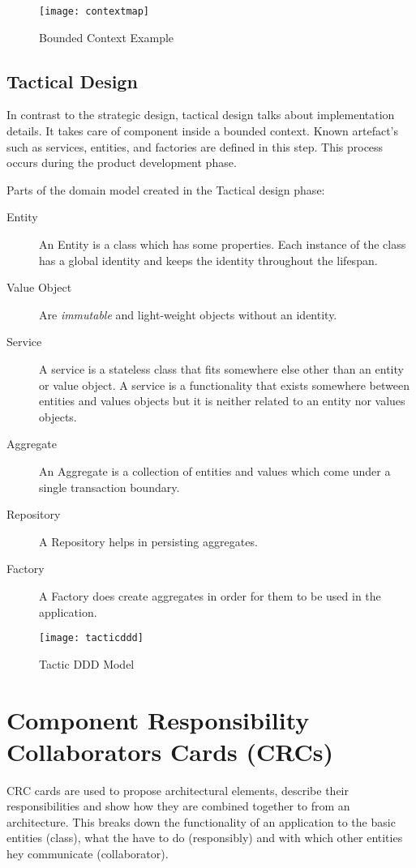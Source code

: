 \begin{figure}[H]
  \center
  \texttt{[image: contextmap]}
  \caption{Bounded Context Example}
  \label{fig:contextmap}
\end{figure}

\pagebreak

\subsection{Tactical Design}
In contrast to the strategic design, tactical design talks about implementation details. It takes care of component inside a bounded context. Known artefact's such as services, entities, and factories are defined in this step. This process occurs during the product development phase.

Parts of the domain model created in the Tactical design phase:
\begin{description}
	\item [Entity] An Entity is a class which has some properties. Each instance of the class has a global identity and keeps the identity throughout the lifespan.
	\item [Value Object] Are \textit{immutable} and light-weight objects without an identity. 
	\item [Service] A service is a stateless class that fits somewhere else other than an entity or value object. A service is a functionality that exists somewhere between entities and values objects but it is neither related to an entity nor values objects.
	\item [Aggregate] An Aggregate is a collection of entities and values which come under a single transaction boundary.
	\item [Repository] A Repository helps in persisting aggregates.
	\item [Factory] A Factory does create aggregates in order for them to be used in the application.
\end{description}

\begin{figure}[H]
  \center
  \texttt{[image: tacticddd]}
  \caption{Tactic DDD Model}
\end{figure}

\section{Component Responsibility Collaborators Cards (CRCs)}
CRC cards are used to propose architectural elements, describe their responsibilities and show how they are combined together to from an architecture. This breaks down the functionality of an application to the basic entities (class), what the have to do (responsibly) and with which other entities hey communicate (collaborator).

